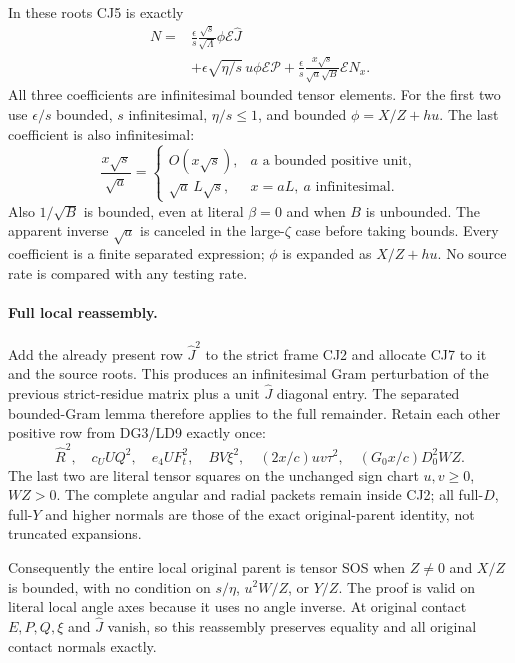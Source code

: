 In these roots CJ5 is exactly
\[
\begin{split}
 N={}&\frac{\epsilon}{s}\frac{\sqrt s}{\sqrt\Lambda}
                  \phi\mathcal E\widehat J\\
 &+\epsilon\sqrt{\eta/s}\,u\phi\mathcal E\mathcal P
   +\frac{\epsilon}{s}
       \frac{x\sqrt s}{\sqrt a\sqrt B}\mathcal E N_x .
\end{split}                                                    \tag{CJ7}
\]
All three coefficients are infinitesimal bounded tensor elements.
For the first two use $\epsilon/s$ bounded, $s$ infinitesimal,
$\eta/s\le1$, and bounded
$\phi=X/Z+hu$.  The last coefficient is also infinitesimal:
\[
 \frac{x\sqrt s}{\sqrt a}=
 \begin{cases}
 O(x\sqrt s),&a\text{ a bounded positive unit},\\
 \sqrt a\,L\sqrt s,&x=aL,\ a\text{ infinitesimal}.
 \end{cases}                                                   \tag{CJ8}
\]
Also $1/\sqrt B$ is bounded, even at literal $\beta=0$ and when
$B$ is unbounded.  The apparent inverse $\sqrt a$ is canceled in
the large-$\zeta$ case before taking bounds.  Every coefficient is
a finite separated expression; $\phi$ is expanded as $X/Z+hu$.
No source rate is compared with any testing rate.

\paragraph{Full local reassembly.}
Add the already present row $\widehat J^2$ to the strict frame
CJ2 and allocate CJ7 to it and the source roots.  This produces an
infinitesimal Gram perturbation of the previous strict-residue
matrix plus a unit $\widehat J$ diagonal entry.  The separated
bounded-Gram lemma therefore applies to the full remainder.
Retain each other positive row from DG3/LD9 exactly once:
\[
 \widehat R^2,\quad c_UUQ^2,\quad e_4UF_t^2,\quad BV\xi^2,
 \quad(2x/c)uv\tau^2,\quad(G_0x/c)D_0^2WZ.
\]
The last two are literal tensor squares on the unchanged sign chart
$u,v\ge0$, $WZ>0$.  The complete angular and radial packets remain
inside CJ2; all full-$D$, full-$Y$ and higher normals are those of
the exact original-parent identity, not truncated expansions.

Consequently the entire local original parent is tensor SOS when
$Z\ne0$ and $X/Z$ is bounded, with no condition on $s/\eta$,
$u^2W/Z$, or $Y/Z$.  The proof is valid on literal local angle axes
because it uses no angle inverse.  At original contact $E,P,Q,\xi$
and $\widehat J$ vanish, so this reassembly preserves equality and
all original contact normals exactly.

